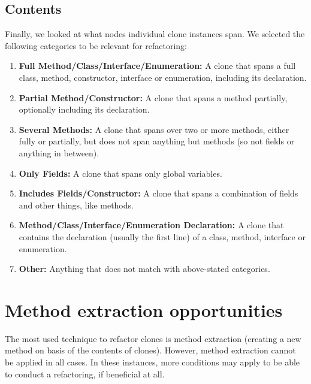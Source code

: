 \subsection{Contents}\label{sec:setupcontents}
Finally, we looked at what nodes individual clone instances span. We selected the following categories to be relevant for refactoring:
\begin{enumerate}
  \item \textbf{Full Method/Class/Interface/Enumeration:} A clone that spans a full class, method, constructor, interface or enumeration, including its declaration.
  \item \textbf{Partial Method/Constructor:} A clone that spans a method partially, optionally including its declaration.
  \item \textbf{Several Methods:} A clone that spans over two or more methods, either fully or partially, but does not span anything but methods (so not fields or anything in between).
  \item \textbf{Only Fields:} A clone that spans only global variables.
  \item \textbf{Includes Fields/Constructor:} A clone that spans a combination of fields and other things, like methods.
  \item \textbf{Method/Class/Interface/Enumeration Declaration:} A clone that contains the declaration (usually the first line) of a class, method, interface or enumeration.
  \item \textbf{Other:} Anything that does not match with above-stated categories.
\end{enumerate}


\section{Method extraction opportunities}\label{sec:refactorabilitysetup}
The most used technique to refactor clones is method extraction (creating a new method on basis of the contents of clones). However, method extraction cannot be applied in all cases. In these instances, more conditions may apply to be able to conduct a refactoring, if beneficial at all.

